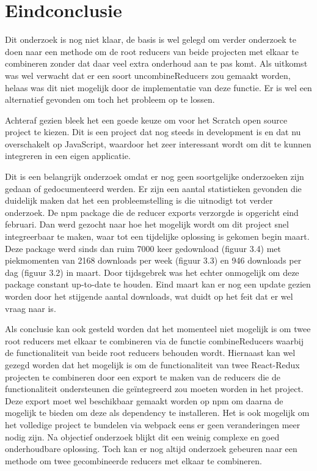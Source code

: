 \section{Eindconclusie}
Dit onderzoek is nog niet klaar, de basis is wel gelegd om verder onderzoek te doen naar een methode om de root reducers van beide projecten met elkaar te combineren zonder dat daar veel extra onderhoud aan te pas komt. Als uitkomst was wel verwacht dat er een soort uncombineReducers zou gemaakt worden, helaas was dit niet mogelijk door de implementatie van deze functie. Er is wel een alternatief gevonden om toch het probleem op te lossen. 

Achteraf gezien bleek het een goede keuze om voor het Scratch open source project te kiezen. Dit is een project dat nog steeds in development is en dat nu overschakelt op JavaScript, waardoor het zeer interessant wordt om dit te kunnen integreren in een eigen applicatie.   

Dit is een belangrijk onderzoek omdat er nog geen soortgelijke onderzoeken zijn gedaan of gedocumenteerd werden.
Er zijn een aantal statistieken gevonden die duidelijk maken dat het een probleemstelling is die uitnodigt tot verder onderzoek. De npm package die de reducer exports verzorgde is opgericht eind februari. Dan werd gezocht naar hoe het mogelijk wordt om dit project snel integreerbaar te maken, waar tot een tijdelijke oplossing is gekomen begin maart. Deze package werd sinds dan ruim 7000 keer gedownload (figuur 3.4) met piekmomenten van 2168 downloads per week (figuur 3.3) en 946 downloads per dag (figuur 3.2) in maart. Door tijdsgebrek was het echter onmogelijk om deze package constant up-to-date te houden. Eind maart kan er nog een update gezien worden door het stijgende aantal downloads, wat duidt op het feit dat er wel vraag naar is.


Als conclusie kan ook gesteld worden dat het momenteel niet mogelijk is om twee root reducers met elkaar te combineren via de functie combineReducers waarbij de functionaliteit van beide root reducers behouden wordt. Hiernaast kan wel gezegd worden dat het mogelijk is om de functionaliteit van twee React-Redux projecten te combineren door een export te maken van de reducers die de functionaliteit ondersteunen die geïntegreerd zou moeten worden in het project. Deze export moet wel beschikbaar gemaakt worden op npm om daarna de mogelijk te bieden om deze als dependency te installeren. Het is ook mogelijk om het volledige project te bundelen via webpack eens er geen veranderingen meer nodig zijn. Na objectief onderzoek blijkt dit een weinig complexe en goed onderhoudbare oplossing. Toch kan er nog altijd onderzoek gebeuren naar een methode om twee gecombineerde reducers met elkaar te combineren. 


